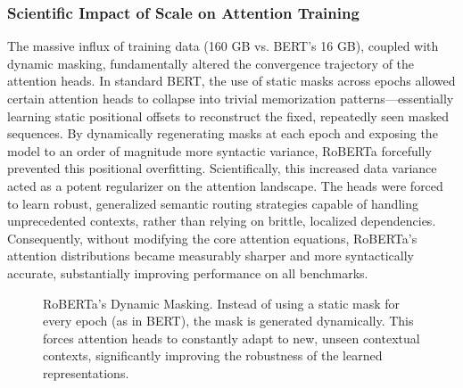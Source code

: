 \documentclass[11pt]{article}
\begin{document}
\subsubsection{Scientific Impact of Scale on Attention Training}
The massive influx of training data (160 GB vs. BERT's 16 GB), coupled with dynamic masking, fundamentally altered the convergence trajectory of the attention heads. In standard BERT, the use of static masks across epochs allowed certain attention heads to collapse into trivial memorization patterns—essentially learning static positional offsets to reconstruct the fixed, repeatedly seen masked sequences. By dynamically regenerating masks at each epoch and exposing the model to an order of magnitude more syntactic variance, RoBERTa forcefully prevented this positional overfitting. Scientifically, this increased data variance acted as a potent regularizer on the attention landscape. The heads were forced to learn robust, generalized semantic routing strategies capable of handling unprecedented contexts, rather than relying on brittle, localized dependencies. Consequently, without modifying the core attention equations, RoBERTa's attention distributions became measurably sharper and more syntactically accurate, substantially improving performance on all benchmarks.

\begin{figure}[ht]
\centering
{}
\caption{RoBERTa's Dynamic Masking. Instead of using a static mask for every epoch (as in BERT), the mask is generated dynamically. This forces attention heads to constantly adapt to new, unseen contextual contexts, significantly improving the robustness of the learned representations.}
\label{fig:roberta_dynamic}
\end{figure}
\end{document}
